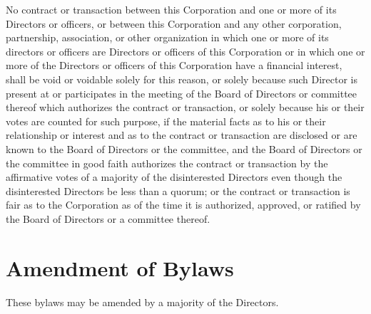 No contract or transaction between this Corporation and one or more of its
Directors or officers, or between this Corporation and any other corporation,
partnership, association, or other organization in which one or more of its
directors or officers are Directors or officers of this Corporation or in which
one or more of the Directors or officers of this Corporation have a financial
interest, shall be void or voidable solely for this reason, or solely because
such Director is present at or participates in the meeting of the Board of
Directors or committee thereof which authorizes the contract or transaction, or
solely because his or their votes are counted for such purpose, if the material
facts as to his or their relationship or interest and as to the contract or
transaction are disclosed or are known to the Board of Directors or the
committee, and the Board of Directors or the committee in good faith authorizes
the contract or transaction by the affirmative votes of a majority of the
disinterested Directors even though the disinterested Directors be less than a
quorum; or the contract or transaction is fair as to the Corporation as of the
time it is authorized, approved, or ratified by the Board of Directors or a
committee thereof.

\section{Amendment of Bylaws}

These bylaws may be amended by a majority of the Directors.
